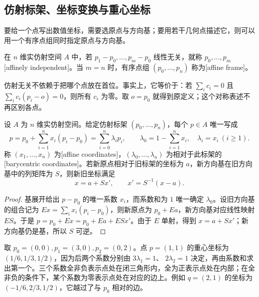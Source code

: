 \subsection{仿射标架、坐标变换与重心坐标}
\label{g1:subsec:0101:02}

要给一个点写出数值坐标，需要选原点与方向基；要用若干几何点描述它，则可以用一个有序点组同时指定原点与方向基。

\begin{definition}\label{g1:def:affine-frame}
	在 \(n\) 维实仿射空间 \(A\) 中，若 \(p_1-p_0,\ldots,p_m-p_0\) 线性无关，就称 \(p_0,\ldots,p_m\) [affinely independent]。当 \(m=n\) 时，有序点组 \((p_0,\ldots,p_n)\) 称为[affine frame]。
\end{definition}

仿射无关不依赖于把哪个点放在首位。事实上，它等价于：若 \(\sum_i c_i=0\) 且 \(\sum_i c_i(p_i-o)=0\)，则所有 \(c_i\) 为零。取 \(o=p_0\) 就得到原定义；这个对称表述不再区别各点。

\begin{proposition}\label{g1:prop:affine-coordinates}
	设 \(A\) 为 \(n\) 维实仿射空间。给定仿射标架 \((p_0,\ldots,p_n)\)，每个 \(p\in A\) 唯一写成
	\[
		p=p_0+\sum_{i=1}^n x_i(p_i-p_0)
		=\sum_{i=0}^n\lambda_i p_i,\qquad
		\lambda_0=1-\sum_{i=1}^n x_i,\quad\lambda_i=x_i\ (i\ge1).
	\]
	称 \((x_1,\ldots,x_n)\) 为[affine coordinates]，\((\lambda_0,\ldots,\lambda_n)\) 为相对于此标架的[barycentric coordinates]。若新原点相对于旧标架的坐标为 \(a\)，新方向基在旧方向基中的列矩阵为 \(S\)，则新旧坐标满足
	\[
		x=a+Sx',\qquad x'=S^{-1}(x-a).
	\]
\end{proposition}
\begin{proof}
	基展开给出 \(p-p_0\) 的唯一系数 \(x_i\)，而系数和为 \(1\) 唯一确定 \(\lambda_0\)。设旧方向基的组合记为 \(Ex=\sum_i x_i(p_i-p_0)\)，则新原点为 \(p_0+Ea\)，新方向基对应线性映射 \(ES\)。于是 \(p=p_0+Ex=p_0+Ea+ESx'\)。由于 \(E\) 单射，得到 \(x=a+Sx'\)；新方向基仍是基，所以 \(S\) 可逆。
\end{proof}

\begin{example}\label{g1:exm:barycentric-triangle}
	取 \(p_0=(0,0),p_1=(3,0),p_2=(0,2)\)。点 \(p=(1,1)\) 的重心坐标为 \((1/6,1/3,1/2)\)，因为后两个系数分别由 \(3\lambda_1=1\)、 \(2\lambda_2=1\) 决定，再由系数和求出第一个。三个系数全非负表示点处在闭三角形内，全为正表示点处在内部；在全非负的条件下，某个系数为零表示点处在对应的边上。例如 \(q=(2,1)\) 的坐标为 \((-1/6,2/3,1/2)\)，它越过了与 \(p_0\) 相对的边。
\end{example}

